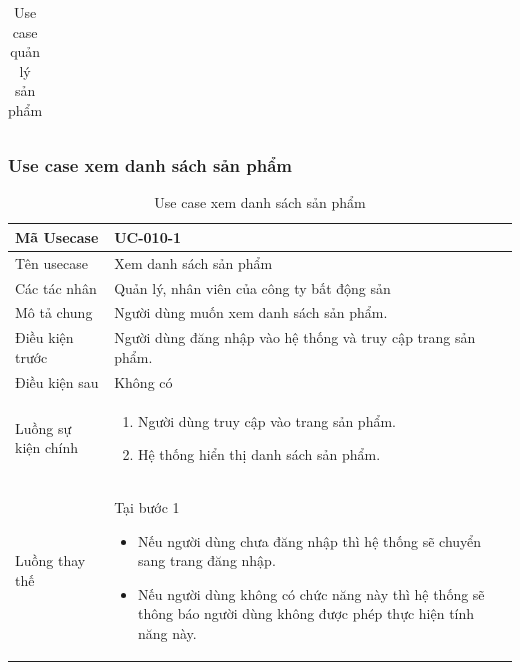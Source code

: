 \documentclass[12pt,a4paper]{article}
\begin{document}
\begin{table}[H]
\begin{tabular}{|p{3.5cm}|p{11.5cm}|c|}
            \\ \hline
        \end{tabular}
        \caption{Use case quản lý sản phẩm}

    \end{table}

    \subsubsection*{Use case xem danh sách sản phẩm }
    \begin{table}[H]
        \centering
        \begin{tabular}{|p{3.5cm}|p{11.5cm}|c|}
            \hline
            Mã Usecase      & UC-010-1                                                      \\
            \hline
            Tên usecase     & Xem danh sách sản phẩm                                        \\
            \hline
            Các tác nhân    & Quản lý, nhân viên của công ty bất động sản                   \\
            \hline
            Mô tả chung     & Người dùng muốn xem danh sách sản phẩm.                       \\
            \hline

            Điều kiện trước & Người dùng đăng nhập vào hệ thống và truy cập trang sản phẩm. \\
            \hline

            Điều kiện sau   & Không có                                                      \\
            \hline

            Luồng sự kiện chính & \vspace{-.8cm}\begin{enumerate}
                                                    \item Người dùng truy cập vào trang sản phẩm.
                                                    \item Hệ thống hiển thị danh sách sản phẩm.
            \end{enumerate}
            \\
            \hline
            Luồng thay thế & Tại bước 1\newline
            \vspace{-.8cm}\begin{itemize}
                              \item Nếu người dùng chưa đăng nhập thì hệ thống sẽ chuyển sang trang đăng nhập.
                              \item  Nếu người dùng không có chức năng này thì hệ thống sẽ thông báo người dùng không được phép thực hiện tính năng này.
            \end{itemize}

            \\    \hline
        \end{tabular}
        \caption{Use case xem danh sách sản phẩm }
    \end{table}
\end{document}

